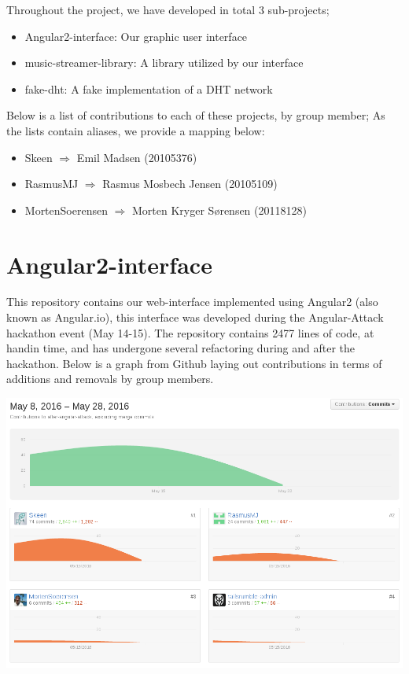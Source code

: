 \label{sec:appendix-contributions}

Throughout the project, we have developed in total 3 sub-projects;
\begin{itemize}
\item Angular2-interface: Our graphic user interface
\item music-streamer-library: A library utilized by our interface
\item fake-dht: A fake implementation of a DHT network
\end{itemize}
Below is a list of contributions to each of these projects, by group member;
As the lists contain aliases, we provide a mapping below:
\begin{itemize}
    \item Skeen $\Rightarrow$ Emil Madsen (20105376)
    \item RasmusMJ $\Rightarrow$ Rasmus Mosbech Jensen (20105109)
    \item MortenSoerensen $\Rightarrow$ Morten Kryger Sørensen (20118128)
\end{itemize}

\section{Angular2-interface}
This repository contains our web-interface implemented using Angular2 (also 
known as Angular.io), this interface was developed during the Angular-Attack
hackathon event (May 14-15).
\newline\newline
The repository contains 2477 lines of code, at handin time, and has undergone 
several refactoring during and after the hackathon.
\newline\newline
Below is a graph from Github laying out contributions in terms of additions and
removals by group members.

\includegraphics[width=\linewidth]{gfx/Angular-interface}

